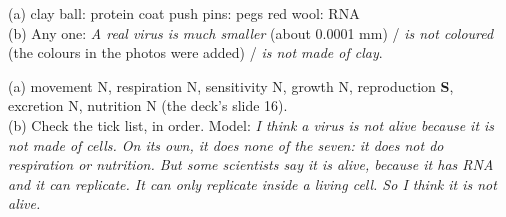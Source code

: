 \documentclass[12pt,a4paper]{article}
\begin{document}
\noindent (a) clay ball: protein coat \quad push pins: pegs \quad red wool: RNA \\
(b) Any one: \emph{A real virus is much smaller} (about 0.0001 mm) / \emph{is not
coloured} (the colours in the photos were added) / \emph{is not made of clay}.

\smallskip
{}

\noindent (a) movement N, respiration N, sensitivity N, growth N, reproduction
\textbf{S}, excretion N, nutrition N (the deck's slide 16). \\
(b) Check the tick list, in order. Model: \emph{I think a virus is not alive because it
is not made of cells. On its own, it does none of the seven: it does not do
respiration or nutrition. But some scientists say it is alive, because it has RNA and
it can replicate. It can only replicate inside a living cell. So I think it is not
alive.}

\smallskip
{}

\fi
\end{document}
